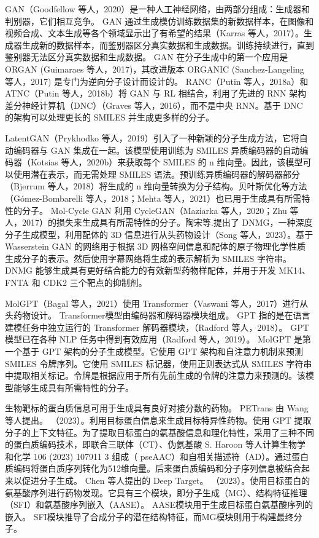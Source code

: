 GAN（Goodfellow 等人，2020）是一种人工神经网络，由两部分组成：生成器和判别器，它们相互竞争。 GAN 通过生成模仿训练数据集的新数据样本，在图像和视频合成、文本生成等各个领域显示出了有希望的结果（Karras 等人，2017）。生成器生成新的数据样本，而鉴别器区分真实数据和生成数据。训练持续进行，直到鉴别器无法区分真实数据和生成数据。 GAN 在分子生成中的第一个应用是 ORGAN (Guimaraes 等人，2017)，其改进版本 ORGANIC (Sanchez-Langeling 等人，2017) 是专门为逆向分子设计而设计的。 RANC（Putin 等人，2018a）和 ATNC（Putin 等人，2018b）将 GAN 与 RL 相结合，利用了先进的 RNN 架构差分神经计算机（DNC）（Graves 等人，2016），而不是中央 RNN。基于 DNC 的架构可以处理更长的 SMILES 并生成更多样的分子。

LatentGAN（Prykhodko 等人，2019）引入了一种新颖的分子生成方法，它将自动编码器与 GAN 集成在一起。该模型使用训练为 SMILES 异质编码器的自动编码器（Kotsias 等人，2020b）来获取每个 SMILES 的 n 维向量。因此，该模型可以使用潜在表示，而无需处理 SMILES 语法。预训练异质编码器的解码器部分（Bjerrum 等人，2018）将生成的 n 维向量转换为分子结构。贝叶斯优化等方法（Gómez-Bombarelli 等人，2018；Mehta 等人，2021）也已用于生成具有所需特性的分子。 Mol-Cycle GAN 利用 CycleGAN（Maziarka 等人，2020；Zhu 等人，2017）的损失来生成具有所需特性的分子。陶宋等.提出了 DNMG，一种深度分子生成模型，利用配体的 3D 信息进行从头药物设计（Song 等人，2023）。基于 Wasserstein GAN 的网络用于根据 3D 网格空间信息和配体的原子物理化学性质生成分子的表示。然后使用字幕网络将生成的表示解析为 SMILES 字符串。 DNMG 能够生成具有更好结合能力的有效新型药物样配体，并用于开发 MK14、FNTA 和 CDK2 三个靶点的抑制剂。

MolGPT（Bagal 等人，2021）使用 Transformer（Vaswani 等人，2017）进行从头药物设计。 Transformer模型由编码器和解码器模块组成。 GPT 指的是在语言建模任务中独立运行的 Transformer 解码器模块，（Radford 等人，2018）。 GPT 模型已在各种 NLP 任务中得到有效应用（Radford 等人，2019）。 MolGPT 是第一个基于 GPT 架构的分子生成模型。它使用 GPT 架构和自注意力机制来预测 SMILES 令牌序列。它使用 SMILES 标记器，使用正则表达式从 SMILES 字符串中提取相关标记。令牌是根据应用于所有先前生成的令牌的注意力来预测的。该模型能够生成具有所需特性的分子。

生物靶标的蛋白质信息可用于生成具有良好对接分数的药物。 PETrans 由 Wang 等人提出。 （2023）。利用目标蛋白信息来生成目标特异性药物。使用 GPT 提取分子的上下文特征。为了提取目标蛋白的氨基酸信息和理化特性，采用了三种不同的蛋白质编码技术，即联合三联体（CT）、伪氨基酸 S. Haroon 等人计算生物学和化学 106 (2023) 107911 3 组成（ pseAAC）和自相关描述符（AD）。通过蛋白质编码将蛋白质序列转化为512维向量。后来蛋白质编码和分子序列信息被结合起来以促进分子生成。 Chen 等人提出的 Deep Target。 （2023）。使用目标蛋白的氨基酸序列进行药物发现。它具有三个模块，即分子生成（MG）、结构特征推理（SFI）和氨基酸序列嵌入（AASE）。 AASE模块用于生成目标蛋白氨基酸序列的嵌入。 SFI模块推导了合成分子的潜在结构特征，而MG模块则用于构建最终分子。

